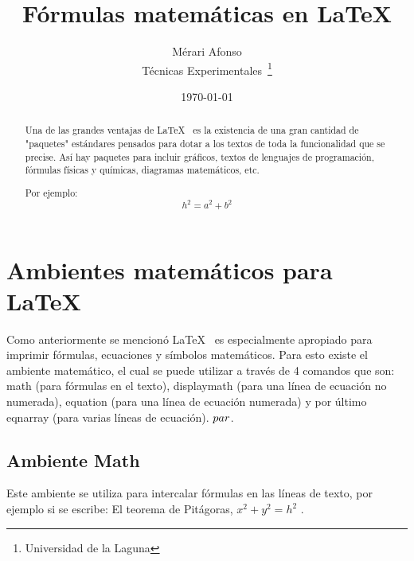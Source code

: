 \documentclass[a4paper,12pt]{article}
\begin{document}
\title{Fórmulas matemáticas en LaTeX}
\author{Mérari Afonso \\
        Técnicas Experimentales~\footnote{Universidad de la Laguna}
        }
\date{\today}
\maketitle
\begin{abstract}
  Una de las grandes ventajas de \LaTeX{}~\cite{Lam:86} es la 
  existencia de una gran cantidad de "paquetes" estándares pensados 
  para dotar a los textos de toda la funcionalidad que se precise. 
  Así hay paquetes para incluir gráficos, textos de lenguajes de programación,
  fórmulas físicas y químicas, diagramas matemáticos, etc.
  
  Por ejemplo:  \[h^2=a^2 + b^2 \]
\end{abstract}

\section{Ambientes matemáticos para LaTeX}
Como anteriormente se mencionó \LaTeX{}~\cite{Lam:86} es especialmente apropiado 
para imprimir fórmulas, ecuaciones y símbolos matemáticos. 
Para esto existe el ambiente matemático, el cual se puede utilizar 
a través de 4 comandos que son: math (para fórmulas en el texto), 
displaymath (para una línea de ecuación no numerada), equation 
(para una línea de ecuación numerada) y por último eqnarray 
(para varias líneas de ecuación). $\\par$.

\subsection{Ambiente Math}
Este ambiente se utiliza para intercalar fórmulas en las líneas de texto, 
por ejemplo si se escribe: El teorema de Pitágoras, $x^{2} + y^{2} = h^{2}$ . 
\end{document}
